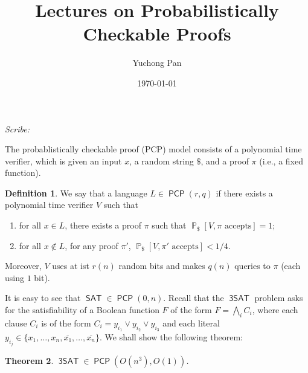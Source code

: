 \documentclass[letterpaper, reqno,11pt]{article}
\newcommand{\PP}{\mathop{{}\mathbb{P}}}
\DeclareMathOperator{\SAT}{\mathsf{SAT}}
\DeclareMathOperator{\PCP}{\mathsf{PCP}}
\DeclareMathOperator{\threeSAT}{\mathsf{3SAT}}
\begin{document}
\title{Lectures on Probabilistically Checkable Proofs}
\author{Yuchong Pan}
\date{\today}
\newtheorem{theorem}{Theorem}
\newtheorem{lemma}[theorem]{Lemma}
\newtheorem{proposition}[theorem]{Proposition}
\newtheorem{corollary}[theorem]{Corollary}
\newtheorem{fact}[theorem]{Fact}
\newtheorem{problem}[theorem]{Problem}
\newtheorem{observation}[theorem]{Observation}
\newtheorem{claim}{Claim}
\newtheorem{exercise}{Exercise}
\theoremstyle{definition}
\newtheorem{definition}[theorem]{Definition}
%

\begin{framed}
 \hfill \thedate
\begin{center}
\Large{\thetitle}
\end{center}
 \hfill {\em Scribe: \theauthor}
\end{framed}

The probablistically checkable proof (PCP) model consists of a polynomial time verifier, which is given an input $x$, a random string $\$$, and a proof $\pi$ (i.e., a fixed function).

\begin{definition}
  We say that a language $L \in \PCP(r, q)$ if there exists a polynomial time verifier $V$ such that
  \begin{enumerate}[label=(\roman*), itemsep=0pt]
    \item for all $x \in L$, there exists a proof $\pi$ such that $\PP_{\$}[\text{$V, \pi$ accepts}] = 1$;
    \item for all $x \not \in L$, for any proof $\pi'$, $\PP_\text{\$}[\text{$V, \pi'$ accepts}] < 1/4$.
  \end{enumerate}
  Moreover, $V$ uses at ist $r(n)$ random bits and makes $q(n)$ queries to $\pi$ (each using $1$ bit).
\end{definition}

It is easy to see that $\SAT \in \PCP(0, n)$. Recall that the $\threeSAT$ problem asks for the satisfiability of a Boolean function $F$ of the form $F = \bigwedge_i C_i$, where each clause $C_i$ is of the form $C_i = y_{i_1} \vee y_{i_2} \vee y_{i_3}$ and each literal $y_{i_j} \in \{ x_1, \ldots, x_n, \overline{x_1}, \ldots, \overline{x_n} \}$. We shall show the following theorem:

\begin{theorem} \label{thm:3sat-pcp}
  $\threeSAT \in \PCP(O(n^3), O(1))$.
\end{theorem}
\end{document}
